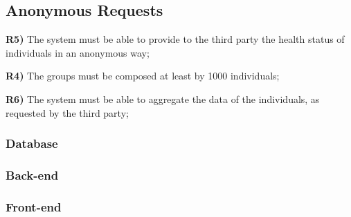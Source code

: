 \subsection{Anonymous Requests}	
	\item {\color{Green}\textbf{R5)}} The system must be able to provide to the third party the health status of individuals
in an anonymous way;
	\item {\color{Green}\textbf{R4)}} The groups must be composed at least by 1000 individuals;
	\item {\color{Green}\textbf{R6)}} The system must be able to aggregate the data of the individuals, as requested by the
third party;
\subsubsection*{Database}


\subsubsection*{Back-end}


\subsubsection*{Front-end}
